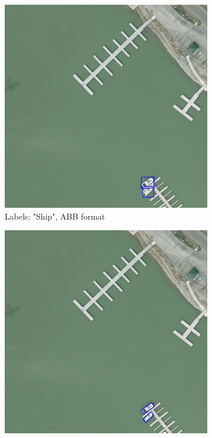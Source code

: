 \begin{figure}[h]
    \begin{subfigure}[b]{0.45\textwidth}
        \centering
        \includegraphics[trim={680pt 50pt 250pt 865pt},clip,width=\textwidth]{images/015Results/01abb_vs_obb/abb_ship.png}
        \caption{Labels: "Ship", ABB format}
        \label{fig:abb_ship}
    \end{subfigure}
    \hfill
    \begin{subfigure}[b]{0.45\textwidth}
        \centering
        \includegraphics[trim={680pt 50pt 250pt 865pt},clip,width=\textwidth]{images/015Results/01abb_vs_obb/obb_ship.png}

\end{subfigure}
\end{figure}
